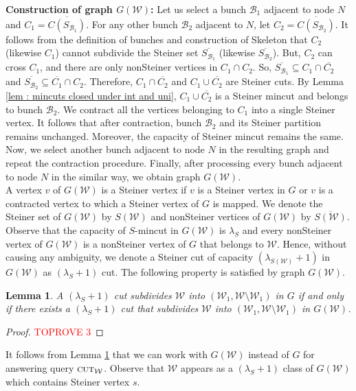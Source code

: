 \documentclass[letterpaper,11pt]{article}
\newtheorem{lemma}{Lemma}[]
\begin{document}
\noindent
\textbf{Construction of graph $G({\mathcal W})$:}
Let us select a bunch ${\mathcal B}_1$ adjacent to node $N$ and $C_1=\overline{C(S_{{\mathcal B}_1})}$. 
For any other bunch ${\mathcal B}_2$ adjacent to $N$, let $C_2=\overline{C(S_{{\mathcal B}_2})}$. It follows from the definition of bunches and construction of Skeleton that $C_2$ (likewise $C_1$) cannot subdivide the Steiner set $\overline{S_{{\mathcal B}_1}}$ (likewise $\overline{S_{{\mathcal B}_2}}$). But, $C_2$ can cross $C_1$, and there are only nonSteiner vertices in $C_1\cap C_2$. So, $\overline{S_{{\mathcal B}_1}}\subseteq C_1\cap \overline{C_2}$ and $\overline{S_{{\mathcal B}_2}}\subseteq \overline{C_1}\cap C_2$. Therefore, $C_1\cap \overline{C_2}$ and $C_1\cup \overline{C_2}$ are Steiner cuts. By Lemma \ref{lem : mincuts closed under int and uni}, $C_1\cup \overline{C_2}$ is a Steiner mincut and belongs to bunch ${\mathcal B}_2$.
We contract all the vertices belonging to $C_1$ into a single Steiner vertex. It follows that after contraction, bunch ${\mathcal B}_2$ and its Steiner partition remains unchanged. Moreover, the capacity of Steiner mincut remains the same. Now, we select another bunch adjacent to node $N$ in the resulting graph and repeat the contraction procedure. Finally, after processing every bunch adjacent to node $N$ in the similar way, we obtain graph $G({\mathcal W})$.\\


 


\noindent
A vertex $v$ of $G({\mathcal W})$ is a Steiner vertex if $v$ is a Steiner vertex in $G$ or $v$ is a contracted vertex to which a Steiner vertex of $G$ is mapped. We denote the Steiner set of $G({\mathcal W})$ by $S({\mathcal W})$ and nonSteiner vertices of $G({\mathcal W})$ by $\overline{S({\mathcal W})}$.  Observe that the capacity of $S$-mincut in $G({\mathcal W})$ is $\lambda_S$ and every nonSteiner vertex of $G({\mathcal W})$ is a nonSteiner vertex of $G$ that belongs to ${\mathcal W}$. Hence, without causing any ambiguity, we denote a Steiner cut of capacity $(\lambda_{S({\mathcal W})}+1)$ in $G({\mathcal W})$ as $(\lambda_S+1)$ cut. The following property is satisfied by graph $G({\mathcal W})$. \begin{lemma} \label{lem : G(W)}
   A $(\lambda_S+1)$ cut subdivides ${\mathcal W}$ into $({\mathcal W}_1,{\mathcal W}\setminus {\mathcal W}_1)$ in $G$ if and only if there exists a $(\lambda_S+1)$ cut that subdivides ${\mathcal W}$ into $({\mathcal W}_1,{\mathcal W}\setminus {\mathcal W}_1)$ in $G({\mathcal W})$. 
\end{lemma}
\begin{proof}\textcolor{red}{TOPROVE 3}\end{proof}
It follows from Lemma \ref{lem : G(W)} that we can work with $G({\mathcal W})$ instead of $G$ for answering query $\textsc{cut}_{\mathcal W}$.
Observe that ${\mathcal W}$ appears as a $(\lambda_S+1)$ class of $G({\mathcal W})$ which contains Steiner vertex $s$.
\end{document}
